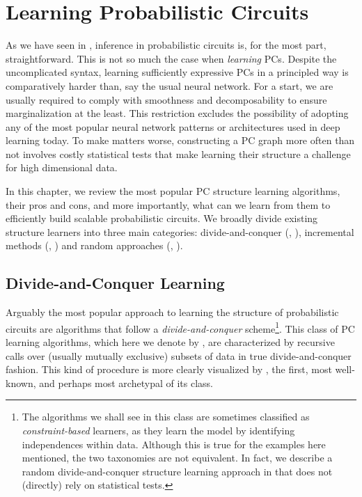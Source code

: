 \chapter{Learning Probabilistic Circuits}
\label{ch:learning}

As we have seen in , inference in probabilistic circuits is, for the most part,
straightforward.  This is not so much the case when \emph{learning} PCs. Despite the uncomplicated
syntax, learning sufficiently expressive PCs in a principled way is comparatively harder than, say
the usual neural network. For a start, we are usually required to comply with smoothness and
decomposability to ensure marginalization at the least. This restriction excludes the possibility
of adopting any of the most popular neural network patterns or architectures used in deep learning
today. To make matters worse, constructing a PC graph more often than not involves costly
statistical tests that make learning their structure a challenge for high dimensional data.

In this chapter, we review the most popular PC structure learning algorithms, their pros and cons,
and more importantly, what can we learn from them to efficiently build scalable probabilistic
circuits. We broadly divide existing structure learners into three main categories:
divide-and-conquer (\divclass{}, ), incremental methods (\incrclass{},
) and random approaches (\randclass{}, ).

\section{Divide-and-Conquer Learning}
\label{sec:divconq}

Arguably the most popular approach to learning the structure of probabilistic circuits are
algorithms that follow a \emph{divide-and-conquer} scheme\footnote{The algorithms we shall see in
this class are sometimes classified as \emph{constraint-based} \citep{spirtes95} learners, as they
learn the model by identifying independences within data. Although this is true for the examples
here mentioned, the two taxonomies are not equivalent. In fact, we describe a random
divide-and-conquer structure learning approach in  that does not (directly) rely on
statistical tests.}. This class of PC learning algorithms, which here we denote by \divclass{}, are
characterized by recursive calls over (usually mutually exclusive) subsets of data in true
divide-and-conquer fashion. This kind of procedure is more clearly visualized by
, the first, most well-known, and perhaps most archetypal of its class.

